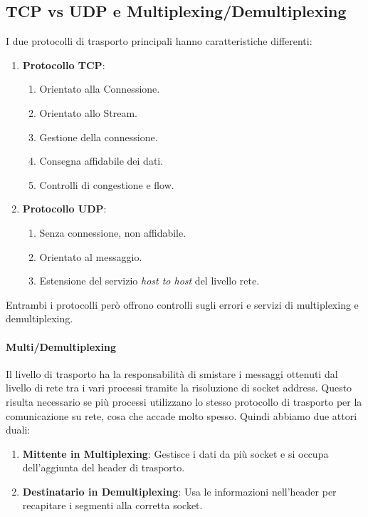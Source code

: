 \documentclass{article}
\begin{document}
\newpage

\subsection{TCP vs UDP e Multiplexing/Demultiplexing}

I due protocolli di trasporto principali hanno caratteristiche differenti:

\begin{enumerate}
    \item \textbf{Protocollo TCP}:
    \begin{enumerate}
        \item Orientato alla Connessione.
        \item Orientato allo Stream.
        \item Gestione della connessione.
        \item Consegna affidabile dei dati.
        \item Controlli di congestione e flow.
    \end{enumerate}
    \item \textbf{Protocollo UDP}:
    \begin{enumerate}
        \item Senza connessione, non affidabile.
        \item Orientato al messaggio.
        \item Estensione del servizio \textit{host to host} del livello rete.
    \end{enumerate}
\end{enumerate}

Entrambi i protocolli però offrono controlli sugli errori e servizi di multiplexing e demultiplexing.

\paragraph{Multi/Demultiplexing} Il livello di trasporto ha la responsabilità di smistare i messaggi ottenuti dal livello di rete tra i vari processi tramite la risoluzione di socket address.
Questo risulta necessario se più processi utilizzano lo stesso protocollo di trasporto per la comunicazione su rete, cosa che accade molto spesso. Quindi abbiamo due attori duali:

\begin{enumerate}
    \item \textbf{Mittente in Multiplexing}: Gestisce i dati da più socket e si occupa dell'aggiunta del header di trasporto.
    \item \textbf{Destinatario in Demultiplexing}: Usa le informazioni nell'header per recapitare i segmenti alla corretta socket.
\end{enumerate}
\end{document}
